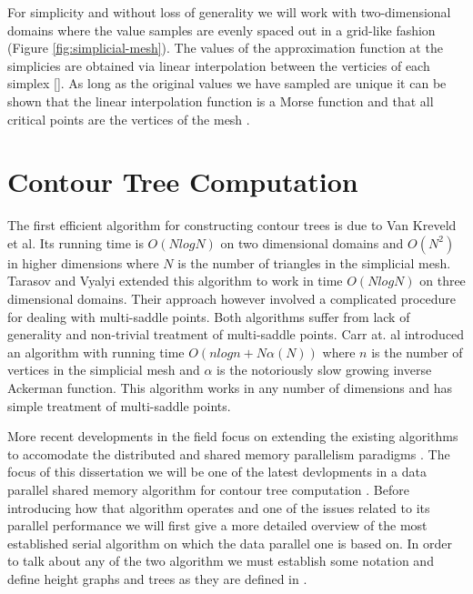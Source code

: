For simplicity and without loss of generality we will work with two-dimensional domains where the value samples are evenly spaced out in a grid-like fashion (Figure \ref{fig:simplicial-mesh}). The values of the approximation function at the simplicies are obtained via linear interpolation between the verticies of each simplex \cite{carr-masters}[]. As long as the original values we have sampled are unique it can be shown that the linear interpolation function is a Morse function and that all critical points are the vertices of the mesh \cite{curvature-embeded-polyhedra}.

\section{Contour Tree Computation}



The first efficient algorithm for constructing contour trees \cite{first-ct-algo} is due to Van Kreveld et al. Its running time is $O(NlogN)$ on two dimensional domains and $O(N^2)$ in higher dimensions where $N$ is the number of triangles in the simplicial mesh. Tarasov and Vyalyi \cite{second-ct-algo} extended this algorithm to work in time $O(NlogN)$ on three dimensional domains. Their approach however involved a complicated procedure for dealing with multi-saddle points. Both algorithms suffer from lack of generality and non-trivial treatment of multi-saddle points. Carr at. al \cite{ct-big-paper} introduced an algorithm with running time $O(nlogn + N\alpha(N))$ where $n$ is the number of vertices in the simplicial mesh and $\alpha$ is the notoriously slow growing inverse Ackerman function. This algorithm works in any number of dimensions and has simple treatment of multi-saddle points.

More recent developments in the field focus on extending the existing algorithms to accomodate the distributed \cite{distributed-ct-algo, distributed-ct-algo-2} and shared memory parallelism paradigms \cite{parallel-peak-pruning, parallel-ct-1}. The focus of this dissertation we will be one of the latest devlopments in a data parallel shared memory algorithm for contour tree computation
\cite{parallel-peak-pruning}. Before introducing how that algorithm operates and one of the issues related to its parallel performance we will first give a more detailed overview of the most established serial algorithm \cite{ct-big-paper} on which the data parallel one is based on. In order to talk about any of the two algorithm we must establish some notation and define height graphs and trees as they are defined in \cite{carr-masters}.


